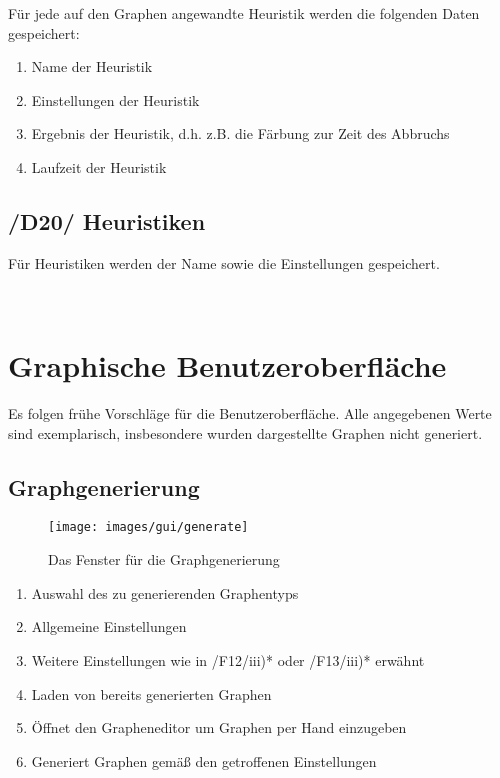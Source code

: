 \documentclass{article}
\begin{document}
	Für jede auf den Graphen angewandte Heuristik werden die folgenden Daten gespeichert:
	\begin{enumerate}[--]
		\item{Name der Heuristik}
		\item{Einstellungen der Heuristik}
		\item{Ergebnis der Heuristik, d.h. z.B. die Färbung zur Zeit des Abbruchs}
		\item{Laufzeit der Heuristik}
	\end{enumerate}
	
	\subsection*{/D20/ Heuristiken} \label{d20} 
	Für Heuristiken werden der Name sowie die Einstellungen gespeichert.
	
	~\newpage
	\section{Graphische Benutzeroberfläche}
	Es folgen frühe Vorschläge für die Benutzeroberfläche. Alle angegebenen Werte sind exemplarisch, insbesondere wurden dargestellte Graphen nicht generiert.
	
	
	
	\subsection{Graphgenerierung}
	\begin{figure}[!h]
		\centering
		\texttt{[image: images/gui/generate]}
		\caption{Das Fenster für die Graphgenerierung}
	\end{figure}
	
	\FloatBarrier
	
	\begin{enumerate}[(1)]
		\item{Auswahl des zu generierenden Graphentyps}
		\item{Allgemeine Einstellungen}
		\item{Weitere Einstellungen wie in /F12/iii)* oder /F13/iii)* erwähnt}
		\item{Laden von bereits generierten Graphen}
		\item{Öffnet den Grapheneditor um Graphen per Hand einzugeben}
		\item{Generiert Graphen gemäß den getroffenen Einstellungen}
	\end{enumerate}
	
\end{document}
